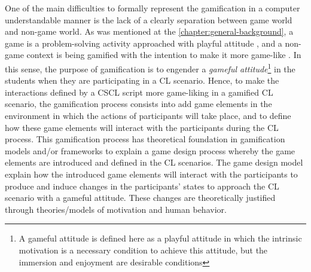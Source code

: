 One of the main difficulties to formally represent the gamification in a computer understandable manner is the lack of a clearly separation between game world and non-game world. As was mentioned at the \autoref{chapter:general-background}, a game is a problem-solving activity approached with playful attitude \cite{Schell2008}, and a non-game context is being gamified with the intention to make it more game-like \cite{Werbach2014}. In this sense, the purpose of gamification is to engender a \emph{gameful attitude}\footnote{A gameful attitude is defined here as a playful attitude in which the intrinsic motivation is a necessary condition to achieve this attitude, but the immersion and enjoyment are desirable conditions} in the students when they are participating in a CL scenario. Hence, to make the interactions defined by a CSCL script more game-liking in a gamified CL scenario, the gamification process consists into add game elements in the environment in which the actions of participants will take place, and to define how these game elements will interact with the participants during the CL process. This gamification process has theoretical foundation in gamification models and/or frameworks to explain a game design process whereby the game elements are introduced and defined in the CL scenarios. The game design model explain how the introduced game elements will interact with the participants to produce and induce changes in the participants' states to approach the CL scenario with a gameful attitude. These changes are theoretically justified through theories/models of motivation and human behavior.

